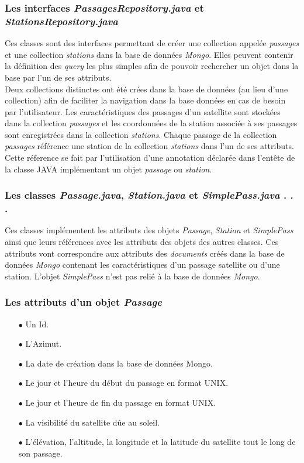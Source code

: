 \documentclass[12pt,fleqn]{book} %
\begin{document}
\subsubsection{Les interfaces \emph{PassagesRepository.java} et \emph{StationsRepository.java}}
\noindent Ces classes sont des interfaces permettant de créer une collection appelée \emph{passages} et une collection \emph{stations} dans la base de données \emph{Mongo}. Elles peuvent contenir la définition des \emph{query} les plus simples afin de pouvoir rechercher un objet dans la base par l'un de ses attributs.
~\\Deux collections distinctes ont été crées dans la base de données (au lieu d'une collection) afin de faciliter la navigation dans la base données en cas de besoin par l'utilisateur. Les caractéristiques des passages d'un satellite sont stockées dans la collection \emph{passages} et les coordonnées de la station associée à ses passages sont enregistrées dans la collection \emph{stations}. Chaque passage de la collection \emph{passages} référence une station de la collection \emph{stations} dans l'un de ses attributs.
Cette réference se fait par l'utilisation d'une annotation déclarée dans l'entête de la classe JAVA implémentant un objet \emph{passage} ou \emph{station}.
\subsubsection{Les classes \emph{Passage.java}, \emph{Station.java} et \emph{SimplePass.java} \color{white}. . .}
\noindent Ces classes implémentent les attributs des objets \emph{Passage}, \emph{Station} et \emph{SimplePass} ainsi que leurs références avec les attributs des objets des autres classes. Ces attributs vont correspondre aux attributs des \emph{documents} créés dans la base de données \emph{Mongo} contenant les caractéristiques d'un passage satellite ou d'une station. L'objet \emph{SimplePass} n'est pas relié à la base de données \emph{Mongo}.
\subsubsection{Les attributs d'un objet \emph{Passage}}
\begin{itemize}
 \item[$\bullet$] Un Id.
 \item[$\bullet$] L'Azimut.
 \item[$\bullet$] La date de création dans la base de données Mongo.
 \item[$\bullet$] Le jour et l'heure du début du passage en format UNIX.
 \item[$\bullet$] Le jour et l'heure de fin du passage en format UNIX.
 \item[$\bullet$] La visibilité du satellite dûe au soleil.
 \item[$\bullet$] L'élévation, l'altitude, la longitude et la latitude du satellite tout le long de son passage.
\end{itemize}
\end{document}
